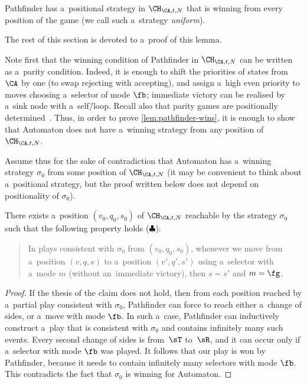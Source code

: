 \documentclass{lmcs}
\numberwithin{equation}{section}
\numberwithin{figure}{section}
\begin{document}
\begin{lem}\label{lem:pathfinder-wins}
	Pathfinder has a~positional strategy in $\CH_{\CA,t,N}$ that is winning from every position of the game (we call such a~strategy \emph{uniform}).
\end{lem}
\noindent %
The rest of this section is devoted to a~proof of this lemma.

Note first that the winning condition of Pathfinder in $\CH_{\CA,t,N}$ can be written as a~parity condition.
Indeed, it is enough to shift the priorities of states from $\CA$ by one (to swap rejecting with accepting), and assign a~high even priority to moves choosing a~selector of mode $\fb$;
immediate victory can be realised by a~sink node with a~self\=/loop.
Recall also that parity games are positionally determined~\cite{jutla_determinacy,mostowski_parity_games}.
Thus, in order to prove \cref{lem:pathfinder-wins}, it is enough to show that Automaton does not have a~winning strategy from any position of~$\CH_{\CA,t,N}$.

Assume thus for the sake of contradiction that Automaton has a~winning strategy $\sigma_0$ from some position of $\CH_{\CA,t,N}$
(it may be convenient to think about a~positional strategy, but the proof written below does not depend on positionality of $\sigma_0$).

\begin{clm}
\label{cl:no-change-sides}
	There exists a~position $(v_0,q_0,s_0)$ of $\CH_{\CA,t,N}$ reachable by the strategy $\sigma_0$ such that the following property holds ($\clubsuit$):
	\begin{quote}
		In plays consistent with $\sigma_0$ from $(v_0,q_0,s_0)$, whenever we move from a~position $(v,q,s)$ to a~position $(v',q',s')$ using a~selector with a~mode $m$ (without an~immediate victory), then $s=s'$ and $m=\fg$.
	\end{quote}
\end{clm}

\begin{proof}
	If the thesis of the claim does not hold, then from each position reached by a~partial play consistent with $\sigma_0$, Pathfinder can force to reach either a~change of sides,
	or a~move with mode $\fb$.
	In such a~case, Pathfinder can inductively construct a~play that is consistent with $\sigma_0$ and contains infinitely many such events.
	Every second change of sides is from~$\sT$ to~$\sR$, and it can occur only if a~selector with mode $\fb$ was played.
	It follows that our play is won by Pathfinder, because it needs to contain infinitely many selectors with mode $\fb$.
	This contradicts the fact that $\sigma_0$ is winning for Automaton.
\end{proof}
\end{document}

